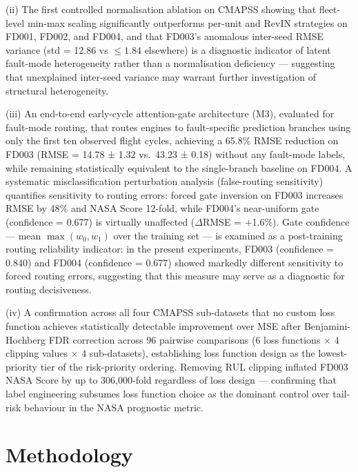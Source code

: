 \documentclass[review,12pt]{elsarticle}
\begin{document}
(ii) The first controlled normalisation ablation on CMAPSS showing that fleet-level min-max scaling significantly outperforms per-unit and RevIN strategies on FD001, FD002, and FD004, and that FD003's anomalous inter-seed RMSE variance (std = 12.86 vs $\leq\!1.84$ elsewhere) is a diagnostic indicator of latent fault-mode heterogeneity rather than a normalisation deficiency --- suggesting that unexplained inter-seed variance may warrant further investigation of structural heterogeneity.

(iii) An end-to-end early-cycle attention-gate architecture (M3), evaluated for fault-mode routing, that routes engines to fault-specific prediction branches using only the first ten observed flight cycles, achieving a 65.8\% RMSE reduction on FD003 (RMSE = 14.78 ± 1.32 vs.\ 43.23 ± 0.18) without any fault-mode labels, while remaining statistically equivalent to the single-branch baseline on FD004. A systematic misclassification perturbation analysis (false-routing sensitivity) quantifies sensitivity to routing errors: forced gate inversion on FD003 increases RMSE by 48\% and NASA Score 12-fold, while FD004's near-uniform gate (confidence = 0.677) is virtually unaffected ($\Delta$RMSE = +1.6\%). Gate confidence --- mean $\max(w_0, w_1)$ over the training set --- is examined as a post-training routing reliability indicator: in the present experiments, FD003 (confidence = 0.840) and FD004 (confidence = 0.677) showed markedly different sensitivity to forced routing errors, suggesting that this measure may serve as a diagnostic for routing decisiveness.

(iv) A confirmation across all four CMAPSS sub-datasets that no custom loss function achieves statistically detectable improvement over MSE after Benjamini-Hochberg FDR correction across 96 pairwise comparisons (6 loss functions $\times$ 4 clipping values $\times$ 4 sub-datasets), establishing loss function design as the lowest-priority tier of the risk-priority ordering. Removing RUL clipping inflated FD003 NASA Score by up to 306,000-fold regardless of loss design --- confirming that label engineering subsumes loss function choice as the dominant control over tail-risk behaviour in the NASA prognostic metric.

\section{Methodology}
\end{document}
